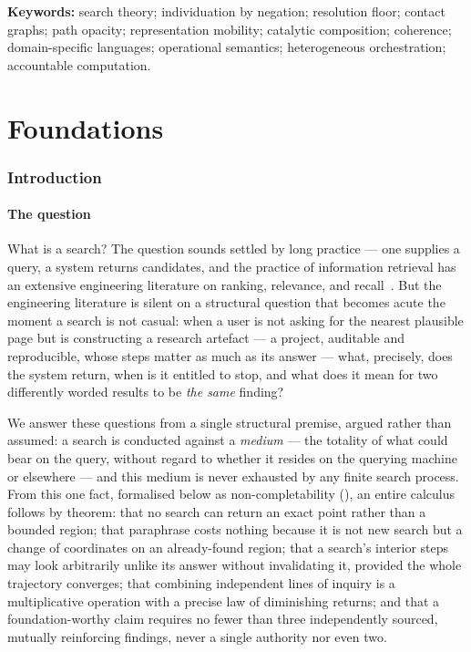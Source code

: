 \documentclass[11pt,twocolumn,a4paper]{article}
\theoremstyle{thmstyle}
\theoremstyle{definition}
\theoremstyle{remark}
\begin{document}
\noindent\textbf{Keywords:} search theory; individuation by negation;
resolution floor; contact graphs; path opacity; representation mobility;
catalytic composition; coherence; domain-specific languages; operational
semantics; heterogeneous orchestration; accountable computation.

\tableofcontents

\part{Foundations}

\section{Introduction}
\label{sec:intro}

\subsection{The question}

What is a search? The question sounds settled by long practice --- one
supplies a query, a system returns candidates, and the practice of
information retrieval has an extensive engineering literature on ranking,
relevance, and recall~\citep{manning2008introduction,salton1983modern}.
But the engineering literature is silent on a structural question that
becomes acute the moment a search is not casual: when a user is not asking
for the nearest plausible page but is constructing a research artefact ---
a project, auditable and reproducible, whose steps matter as much as its
answer --- what, precisely, does the system return, when is it entitled to
stop, and what does it mean for two differently worded results to be
\emph{the same} finding?

We answer these questions from a single structural premise, argued rather
than assumed: a search is conducted against a \emph{medium} --- the totality
of what could bear on the query, without regard to whether it resides on
the querying machine or elsewhere --- and this medium is never exhausted by
any finite search process. From this one fact, formalised below as
non-completability (), an entire calculus follows
by theorem: that no search can return an exact point rather than a bounded
region; that paraphrase costs nothing because it is not new search but a
change of coordinates on an already-found region; that a search's interior
steps may look arbitrarily unlike its answer without invalidating it,
provided the whole trajectory converges; that combining independent lines
of inquiry is a multiplicative operation with a precise law of diminishing
returns; and that a foundation-worthy claim requires no fewer than three
independently sourced, mutually reinforcing findings, never a single
authority nor even two.
\end{document}
